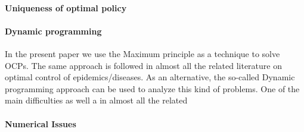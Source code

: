 \paragraph{Uniqueness of optimal policy}



\paragraph{Dynamic programming} In the present paper we use the Maximum principle as a technique to solve OCPs. The same approach is followed in almost all the related literature on optimal control of epidemics/diseases. As an alternative, the so-called Dynamic programming approach can be used to analyze this kind of problems. One of the main difficulties     as well a in almost all the related 




\paragraph{Numerical Issues}